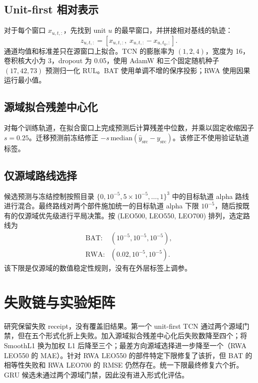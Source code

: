 \documentclass[conference]{IEEEtran}
\begin{document}
\subsection{Unit-first 相对表示}
对于每个窗口 $x_{u,t,:}$，先找到 unit $u$ 的最早窗口，并拼接相对基线的轨迹：
\begin{equation}
 z_{u,t,:}=\left[x_{u,t,:},\;x_{u,t,:}-x_{u,t_0,:}\right].
\end{equation}
通道均值和标准差只在源窗口上拟合。TCN 的膨胀率为 $(1,2,4)$，宽度为 16，卷积核大小为 3，dropout 为 0.05，使用 AdamW 和三个固定随机种子 $(17,42,73)$ 预测归一化 RUL。BAT 使用单调不增的保序投影；RWA 使用因果运行最小值。

\subsection{源域拟合残差中心化}
对每个训练轨道，在拟合窗口上完成预测后计算残差中位数，并乘以固定收缩因子 $s=0.25$。迁移预测前冻结修正 $-s\,\mathrm{median}(\hat y_{\mathrm{src}}-y_{\mathrm{src}})$。该修正不使用验证轨道标签。

\subsection{仅源域路线选择}
候选预测与冻结控制按照目录 $\{0,10^{-5},5\times10^{-5},\ldots,1\}^3$ 中的目标轨道 alpha 路线进行混合。最终路线对两个部件施加统一的目标轨道 alpha 下限 $10^{-5}$，随后按既有的仅源域优先级进行平局决策。按 (LEO500, LEO550, LEO700) 排列，选定路线为
\begin{align*}
\text{BAT}:&(10^{-5},10^{-5},10^{-5}),\\
\text{RWA}:&(0.02,10^{-5},10^{-5}).
\end{align*}
该下限是仅源域的数值稳定性规则，没有在外层标签上调参。

\section{失败链与实验矩阵}
研究保留失败 receipt，没有覆盖旧结果。第一个 unit-first TCN 通过两个源域门禁，但在五个形式化折上失败。加入源域拟合残差中心化后失败数降至四个；将 SmoothL1 换为加权 L1 后降至三个；最差方向源域选择进一步降至一个（RWA LEO550 的 MAE）。针对 RWA LEO550 的部件特定下限修复了该折，但 BAT 的相等性失败和 RWA LEO700 的 RMSE 仍然存在。统一下限最终修复六个折。GRU 候选未通过两个源域门禁，因此没有进入形式化评估。
\end{document}
